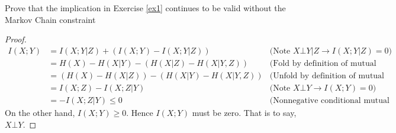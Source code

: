 \begin{exercise}[]{Prove that the implication in Exercise \ref{ex1} continues to be valid without the Markov Chain constraint}
  \begin{proof}
    \begin{equation}
      \begin{array}{rll}
        I(X;Y) &= I(X;Y|Z) + (I(X;Y) - I(X;Y|Z)) & \text{(Note } X \bot Y|Z \rightarrow I(X;Y|Z) = 0 \text{)}\\[2mm]
        &= H(X) - H(X|Y) - (H(X|Z) - H(X|Y,Z)) & \text{(Fold by definition of mutual information)}\\[2mm]
        &= (H(X) - H(X|Z)) - (H(X|Y)- H(X|Y,Z)) & \text{(Unfold by definition of mutual information)}\\[2mm]
        &= I(X;Z) - I(X;Z|Y) &  \text{(Note } X \bot Y \rightarrow I(X;Y) = 0 \text{)} \\[2mm]
        &= - I(X;Z|Y) \le 0 & \text{(Nonnegative conditional mutual information)} 
      \end{array}
    \end{equation}
    On the other hand, $I(X;Y) \ge 0$. Hence $I(X;Y)$ must be zero. That is to say, $X \bot Y$.
  \end{proof}
  \end{exercise}

